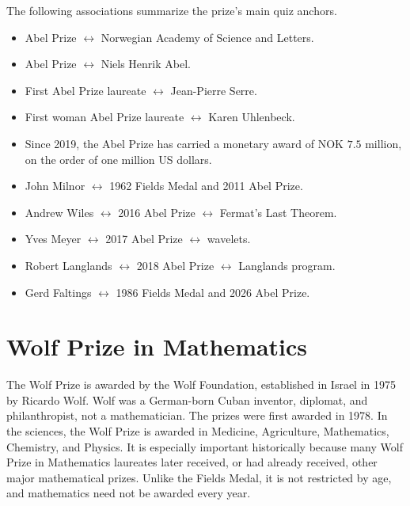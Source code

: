     \begin{fact}
        The following associations summarize the prize's main quiz anchors.
        \begin{itemize}
            \item Abel Prize $\leftrightarrow$ Norwegian Academy of Science and Letters.
            \item Abel Prize $\leftrightarrow$ Niels Henrik Abel.
            \item First Abel Prize laureate $\leftrightarrow$ Jean-Pierre Serre.
            \item First woman Abel Prize laureate $\leftrightarrow$ Karen Uhlenbeck.
            \item Since 2019, the Abel Prize has carried a monetary award of
                  NOK $7.5$ million, on the order of one million US dollars.
            \item John Milnor $\leftrightarrow$ 1962 Fields Medal and 2011 Abel Prize.
            \item Andrew Wiles $\leftrightarrow$ 2016 Abel Prize $\leftrightarrow$ Fermat's Last
            Theorem.
            \item Yves Meyer $\leftrightarrow$ 2017 Abel Prize $\leftrightarrow$ wavelets.
            \item Robert Langlands $\leftrightarrow$ 2018 Abel Prize $\leftrightarrow$ Langlands
            program.
            \item Gerd Faltings $\leftrightarrow$ 1986 Fields Medal and 2026 Abel Prize.
        \end{itemize}
    \end{fact}

    \section*{Wolf Prize in Mathematics}

    The Wolf Prize is awarded by the Wolf Foundation, established in Israel in
    1975 by Ricardo Wolf. Wolf was a German-born Cuban inventor, diplomat, and
    philanthropist, not a mathematician. The prizes were first awarded in 1978.
    In the sciences, the Wolf Prize is awarded in Medicine, Agriculture,
    Mathematics, Chemistry, and Physics. It is especially important
    historically because many Wolf Prize in Mathematics laureates later
    received, or had already received, other major mathematical prizes. Unlike
    the Fields Medal, it is not restricted by age, and mathematics need not be
    awarded every year.

